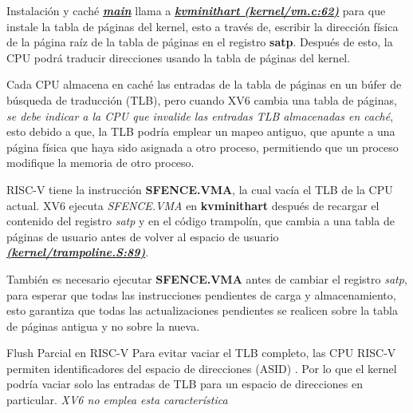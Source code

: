 \documentclass{libs/ufc_format}
\begin{document}
\begin{frame}{Instalación y caché}
  \href{https://github.com/CarlosSandoval-03/xv6-riscv/blob/riscv/kernel/main.c\#L20}{\textbf{\textit{main}}} llama a \href{https://github.com/CarlosSandoval-03/xv6-riscv/blob/riscv/kernel/vm.c\#L62}{\textbf{\textit{kvminithart (kernel/vm.c:62)}}} para que instale la tabla de páginas del kernel, esto a través de, escribir la dirección física de la página raíz de la tabla de páginas en el registro \textbf{satp}. Después de esto, la CPU podrá traducir direcciones usando la tabla de páginas del kernel. \cite{xv6_book} \cite{xv6} \newline

  \vspace{0.3cm}

  Cada CPU almacena en caché las entradas de la tabla de páginas en un búfer de búsqueda de traducción (TLB), pero cuando XV6 cambia una tabla de páginas, \emph{se debe indicar a la CPU que invalide las entradas TLB almacenadas en caché}, esto debido a que, la TLB podría emplear un mapeo antiguo, que apunte a una página física que haya sido asignada a otro proceso, permitiendo que un proceso modifique la memoria de otro proceso. \cite{xv6_book} \cite{xv6}
\end{frame}
\begin{frame}{}
  RISC-V tiene la instrucción \textbf{SFENCE.VMA}, la cual vacía el TLB de la CPU actual. XV6 ejecuta \textit{SFENCE.VMA} en \textbf{kvminithart} después de recargar el contenido del registro \textit{satp} y en el código trampolín, que cambia a una tabla de páginas de usuario antes de volver al espacio de usuario \href{https://github.com/CarlosSandoval-03/xv6-riscv/blob/riscv/kernel/trampoline.S\#L89}{\textbf{\textit{(kernel/trampoline.S:89)}}}. \cite{riscv:priv}

  \vspace{0.3cm}

  También es necesario ejecutar \textbf{SFENCE.VMA} antes de cambiar el registro \textit{satp}, para esperar que todas las instrucciones pendientes de carga y almacenamiento, esto garantiza que todas las actualizaciones pendientes se realicen sobre la tabla de páginas antigua y no sobre la nueva. \cite{xv6_book} \cite{xv6}
\end{frame}
\begin{frame}{Flush Parcial en RISC-V}
  Para evitar vaciar el TLB completo, las CPU RISC-V permiten identificadores del espacio de direcciones (ASID) \cite{xv6_book} \cite{riscv:priv}. Por lo que el kernel podría vaciar solo las entradas de TLB para un espacio de direcciones en particular. \newline
  \emph{XV6 no emplea esta característica}
\end{frame}
\end{document}
